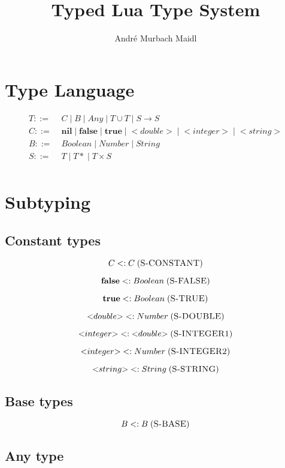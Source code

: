 \documentclass[12pt]{article}
\title{Typed Lua Type System}
\author{André Murbach Maidl}
\newcommand{\mylabel}[1]{\; (\textsc{#1})}
\newcommand{\subtype}{<:}
\newcommand{\pipe}{|\;}
\begin{document}
\maketitle

\section{Type Language}

\begin{align*}
T ::= \; & C \; \pipe B \; \pipe Any \; \pipe
T \cup T \; \pipe S \rightarrow S\\
C ::= \; & \mathbf{nil} \; \pipe \mathbf{false} \; \pipe \mathbf{true} \;
\pipe {<}double{>} \; \pipe {<}integer{>} \; \pipe {<}string{>}\\
B ::= \; & Boolean \; \pipe Number \; \pipe String\\
S ::= \; & T \; \pipe {T*} \; \pipe T \times S\\ 
\end{align*}

\section{Subtyping}

\subsection{Constant types}

\[
C \subtype C
\mylabel{S-CONSTANT}
\]

\[
\mathbf{false} \subtype Boolean
\mylabel{S-FALSE}
\]

\[
\mathbf{true} \subtype Boolean
\mylabel{S-TRUE}
\]

\[
{<}double{>} \subtype Number
\mylabel{S-DOUBLE}
\]

\[
{<}integer{>} \subtype {<}double{>}
\mylabel{S-INTEGER1}
\]

\[
{<}integer{>} \subtype Number
\mylabel{S-INTEGER2}
\]

\[
{<}string{>} \subtype String
\mylabel{S-STRING}
\]

\subsection{Base types}

\[
B \subtype B
\mylabel{S-BASE}
\]

\subsection{Any type}
\end{document}
